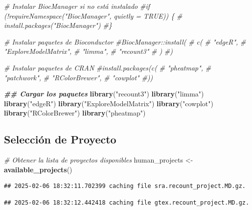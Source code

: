 \documentclass[
]{article}
\newenvironment{Shaded}{\begin{snugshade}}{\end{snugshade}}
\newcommand{\CommentTok}[1]{\textcolor[rgb]{0.56,0.35,0.01}{\textit{#1}}}
\newcommand{\DocumentationTok}[1]{\textcolor[rgb]{0.56,0.35,0.01}{\textbf{\textit{#1}}}}
\newcommand{\FunctionTok}[1]{\textcolor[rgb]{0.13,0.29,0.53}{\textbf{#1}}}
\newcommand{\NormalTok}[1]{#1}
\newcommand{\OtherTok}[1]{\textcolor[rgb]{0.56,0.35,0.01}{#1}}
\newcommand{\StringTok}[1]{\textcolor[rgb]{0.31,0.60,0.02}{#1}}
\begin{document}
\begin{Shaded}
\begin{Highlighting}[]
\CommentTok{\# Instalar BiocManager si no está instalado}
\CommentTok{\#if (!requireNamespace("BiocManager", quietly = TRUE)) \{}
\CommentTok{\#    install.packages("BiocManager")}
\CommentTok{\#\}}

\CommentTok{\# Instalar paquetes de Bioconductor}
\CommentTok{\#BiocManager::install(}
\CommentTok{\#    c(}
\CommentTok{\#        "edgeR", }
\CommentTok{\#        "ExploreModelMatrix",}
\CommentTok{\#        "limma",}
\CommentTok{\#        "recount3"}
\CommentTok{\#    )}
\CommentTok{\#)}

\CommentTok{\# Instalar paquetes de CRAN}
\CommentTok{\#install.packages(c(}
\CommentTok{\#    "pheatmap", }
\CommentTok{\#    "patchwork",}
\CommentTok{\#    "RColorBrewer",}
\CommentTok{\#    "cowplot"}
\CommentTok{\#))}

\DocumentationTok{\#\# Cargar los paquetes}
\FunctionTok{library}\NormalTok{(}\StringTok{"recount3"}\NormalTok{)}
\FunctionTok{library}\NormalTok{(}\StringTok{"limma"}\NormalTok{)}
\FunctionTok{library}\NormalTok{(}\StringTok{"edgeR"}\NormalTok{)}
\FunctionTok{library}\NormalTok{(}\StringTok{"ExploreModelMatrix"}\NormalTok{)}
\FunctionTok{library}\NormalTok{(}\StringTok{"cowplot"}\NormalTok{)}
\FunctionTok{library}\NormalTok{(}\StringTok{"RColorBrewer"}\NormalTok{)}
\FunctionTok{library}\NormalTok{(}\StringTok{"pheatmap"}\NormalTok{)}
\end{Highlighting}
\end{Shaded}

\subsection{Selección de Proyecto}\label{selecciuxf3n-de-proyecto}

\begin{Shaded}
\begin{Highlighting}[]
\CommentTok{\# Obtener la lista de proyectos disponibles }
\NormalTok{human\_projects }\OtherTok{\textless{}{-}} \FunctionTok{available\_projects}\NormalTok{()}
\end{Highlighting}
\end{Shaded}

\begin{verbatim}
## 2025-02-06 18:32:11.702399 caching file sra.recount_project.MD.gz.
\end{verbatim}

\begin{verbatim}
## 2025-02-06 18:32:12.442418 caching file gtex.recount_project.MD.gz.
\end{verbatim}
\end{document}
